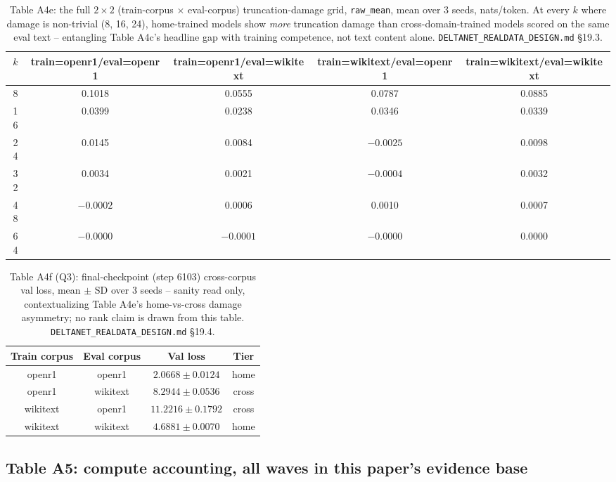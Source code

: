 \begin{table}[htbp]
\centering
\small
\begin{tabular}{ccccc}
\toprule
$k$ & train=openr1/eval=openr1 & train=openr1/eval=wikitext & train=wikitext/eval=openr1 & train=wikitext/eval=wikitext \\
\midrule
8  & 0.1018 & 0.0555 & 0.0787 & 0.0885 \\
16 & 0.0399 & 0.0238 & 0.0346 & 0.0339 \\
24 & 0.0145 & 0.0084 & $-0.0025$ & 0.0098 \\
32 & 0.0034 & 0.0021 & $-0.0004$ & 0.0032 \\
48 & $-0.0002$ & 0.0006 & 0.0010 & 0.0007 \\
64 & $-0.0000$ & $-0.0001$ & $-0.0000$ & 0.0000 \\
\bottomrule
\end{tabular}
\caption{Table A4e: the full $2\times2$ (train-corpus $\times$
eval-corpus) truncation-damage grid, \texttt{raw\_mean}, mean over 3
seeds, nats/token. At every $k$ where damage is non-trivial (8, 16, 24),
home-trained models show \emph{more} truncation damage than
cross-domain-trained models scored on the same eval text -- entangling
Table A4c's headline gap with training competence, not text content
alone. \texttt{DELTANET\_REALDATA\_DESIGN.md} \S19.3.}
\end{table}

\begin{table}[htbp]
\centering
\small
\begin{tabular}{cccc}
\toprule
Train corpus & Eval corpus & Val loss & Tier \\
\midrule
openr1   & openr1   & $2.0668 \pm 0.0124$ & home \\
openr1   & wikitext & $8.2944 \pm 0.0536$ & cross \\
wikitext & openr1   & $11.2216 \pm 0.1792$ & cross \\
wikitext & wikitext & $4.6881 \pm 0.0070$ & home \\
\bottomrule
\end{tabular}
\caption{Table A4f (Q3): final-checkpoint (step 6103) cross-corpus val
loss, mean $\pm$ SD over 3 seeds -- sanity read only, contextualizing
Table A4e's home-vs-cross damage asymmetry; no rank claim is drawn from
this table. \texttt{DELTANET\_REALDATA\_DESIGN.md} \S19.4.}
\end{table}

\clearpage
\subsection{Table A5: compute accounting, all waves in this paper's evidence base}
\label{tab:a5-compute}

